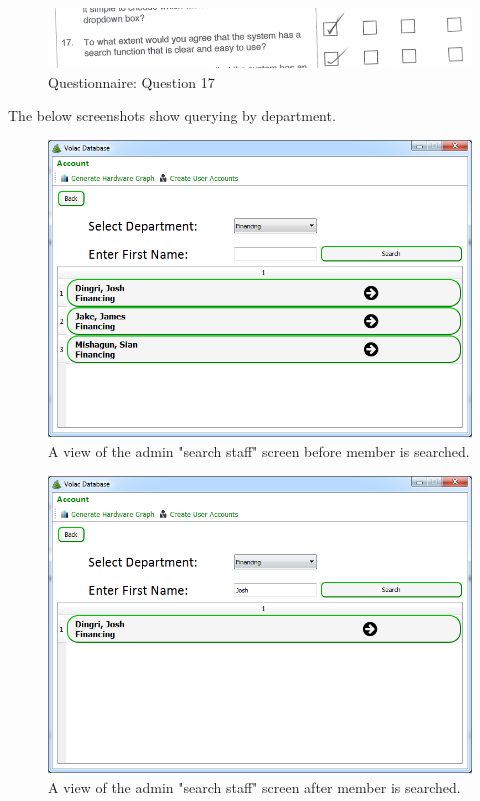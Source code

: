 \begin{figure}[H]
    \includegraphics[width=\textwidth]{./Evaluation/EvaluationQuestionnaire/17.png}
    \caption{Questionnaire: Question 17} 
\end{figure}

The below screenshots show querying by department.

\begin{figure}[H]
    \includegraphics[width=\textwidth]{./Evaluation/Images/beforeadv.png}
    \caption{A view of the admin "search staff" screen before member is searched.} 
\end{figure}

\begin{figure}[H]
    \includegraphics[width=\textwidth]{./Evaluation/Images/afteradv.png}
    \caption{A view of the admin "search staff" screen after member is searched.} 
\end{figure}



